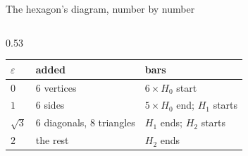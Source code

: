 \documentclass[10pt,aspectratio=169]{beamer}
\newif\ifcomputedslides
\begin{document}
    \ifcomputedslides
    \begin{frame}[shrink=8]{The hexagon's diagram, number by number}
        \begin{columns}[T,onlytextwidth]
            \begin{column}{0.53\textwidth}
                \small
                {\footnotesize
                \begin{tabular}{@{}lll@{}}
                    \toprule
                    $\varepsilon$ & added & bars \\
                    \midrule
                    $0$ & $6$ vertices & $6\times H_0$ start \\
                    $1$ & $6$ sides & $5\times H_0$ end; $H_1$ starts \\
                    $\sqrt3$ & $6$ diagonals, $8$ triangles & $H_1$ ends; $H_2$ starts \\
                    $2$ & the rest & $H_2$ ends \\
                    \bottomrule
                \end{tabular}\par}


\end{column}
\end{columns}
\end{frame}
\end{document}
